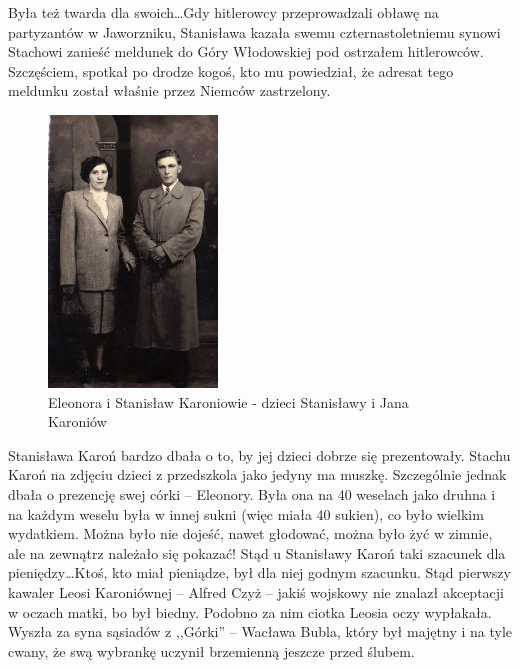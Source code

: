 Była też twarda dla swoich\ldots Gdy hitlerowcy przeprowadzali obławę na partyzantów w Jaworzniku, Stanisława kazała swemu czternastoletniemu synowi Stachowi zanieść meldunek do Góry Włodowskiej pod ostrzałem hitlerowców. Szczęściem, spotkał po drodze kogoś, kto mu powiedział, że adresat tego meldunku został właśnie przez Niemców zastrzelony.


\begin{figure}[!h]
\begin{center}
\includegraphics[width=0.4\textwidth]{zdjecia/eleonora_i_stanislaw_karoniowie.jpg}
\caption[Eleonora i Stanisław Karoniowie]{Eleonora i Stanisław Karoniowie - dzieci Stanisławy i Jana Karoniów}
\label{rys:eleonora_i_stanislaw_karoniowie}
\end{center}
\end{figure}

Stanisława Karoń bardzo dbała o to, by jej dzieci dobrze się prezentowały. Stachu Karoń na zdjęciu
dzieci z przedszkola jako jedyny ma muszkę. Szczególnie jednak dbała o prezencję swej córki -- Eleonory. Była ona na 40 weselach jako druhna i na każdym weselu była w innej sukni (więc miała 40 sukien), co było wielkim wydatkiem. Można było nie dojeść, nawet głodować, można było żyć w zimnie, ale na zewnątrz należało się pokazać! Stąd u Stanisławy Karoń taki szacunek dla pieniędzy\ldots Ktoś, kto miał pieniądze, był dla niej godnym szacunku. Stąd pierwszy kawaler Leosi Karoniównej -- Alfred Czyż -- jakiś wojskowy nie znalazł akceptacji w oczach matki, bo był biedny. Podobno za nim ciotka Leosia oczy wypłakała. Wyszła za syna sąsiadów z ,,Górki'' -- Wacława Bubla, który był majętny i na tyle cwany, że swą wybrankę uczynił brzemienną jeszcze przed ślubem.

